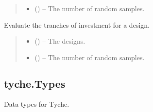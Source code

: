 \documentclass[letterpaper,10pt,english]{sphinxmanual}
\begin{document}
\begin{fulllineitems}
\begin{fulllineitems}
\begin{quote}
\begin{description}
\begin{itemize}
\item {} 
\sphinxAtStartPar
{} () – The number of random samples.

\end{itemize}

\end{description}\end{quote}

\end{fulllineitems}


\begin{fulllineitems}
\label{\detokenize{tyche:tyche.Investments.Investments.evaluate_tranches}}
\pysigstartsignatures
{}
\pysigstopsignatures
\sphinxAtStartPar
Evaluate the tranches of investment for a design.
\begin{quote}\begin{description}
\begin{itemize}
\item {} 
\sphinxAtStartPar
{} () – The designs.

\item {} 
\sphinxAtStartPar
{} () – The number of random samples.

\end{itemize}

\end{description}\end{quote}

\end{fulllineitems}


\end{fulllineitems}



\subsection{tyche.Types}
\label{\detokenize{tyche:module-tyche.Types}}\label{\detokenize{tyche:tyche-types}}
\sphinxAtStartPar
Data types for Tyche.
\end{document}
